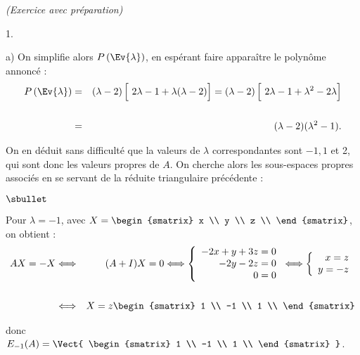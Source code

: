 \documentclass[11pt]{article}%
\begin{document}
\begin{exercice}{\it (Exercice avec préparation)}
\begin{noliste}{1.}
\begin{noliste}{a)}
 On simplifie alors $P \left(\Ev{ \lambda}\right)$, en espérant faire
apparaître le polynôme annoncé : 
 \begin{eqnarray*}
 P \left(\Ev{ \lambda }\right) & = & ( \lambda - 2 ) \left[ \
\rule{0cm}{0.4cm} 2 \lambda - 1 + \lambda ( \lambda - 2 ) \right] = (
\lambda - 2 ) \left[ \ \rule{0cm}{0.4cm} 2 \lambda - 1 + \lambda^{2} -
2 \lambda \right] \\
\\
 & = & ( \lambda - 2 ) ( \lambda^{2} - 1 ).
 \end{eqnarray*}

 On en déduit sans difficulté que la valeurs de $\lambda$
correspondantes sont $-1, 1$ et 2, qui sont donc les valeurs propres de
$A$. On cherche alors les sous-espaces propres associés en se servant
de la réduite triangulaire précédente : \\
\begin{noliste}{$\sbullet$}

 \item Pour $\lambda = -1$, avec $X = \begin{smatrix}
x \\
y \\
z \\
\end{smatrix}
$, on obtient : 
 \begin{eqnarray*}
 A X = - X & \Longleftrightarrow & ( A + I ) X = 0 \Longleftrightarrow
\left\{\begin{array}{r}
 -2x + y + 3 z = 0 \\
-2 y -2 z = 0 \\
0 = 0 \\
\end{array}
\right. \Longleftrightarrow \left\{\begin{array}{r}
 x = z \\
y = - z \\
\end{array}
\right. \\
\\
 & \Longleftrightarrow & X = z \begin{smatrix}
1 \\
-1 \\
1 \\
\end{smatrix}
 \end{eqnarray*}

 donc $E_{ -1 } ( A ) = \Vect { \begin{smatrix}
1 \\
-1 \\
1 \\
\end{smatrix}
}$. 


\end{noliste}
\end{noliste}
\end{noliste}
\end{exercice}
\end{document}
